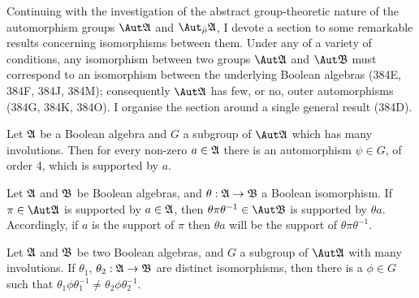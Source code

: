      
\def\chaptername{Automorphisms}
\def\sectionname{Outer automorphisms}
\def\cycleii#1#2#3{\cycle{#1\,_{#2}\,#3}}
     
     
Continuing with the investigation of the abstract group-theoretic nature
of the automorphism groups $\Aut\frak A$ and $\Aut_{\bar\mu}\frak A$, I
devote a section to some remarkable results concerning isomorphisms
between them.   Under any of a variety of conditions, any isomorphism between two groups $\Aut\frak A$ and $\Aut\frak B$ must correspond to an
isomorphism between the underlying Boolean algebras (384E, 384F, 384J,
384M);  consequently $\Aut\frak A$ has few, or no, outer automorphisms
(384G, 384K, 384O).   I organise the section around a single general
result (384D).
     
Let $\frak A$ be a Boolean algebra and $G$ a
subgroup of $\Aut\frak A$ which has many
involutions.   Then for every non-zero
$a\in\frak A$ there is an automorphism $\psi\in G$, of order 4, which
is supported by $a$.
     
     
Let $\frak A$ and $\frak B$ be Boolean algebras, and
$\theta:\frak A\to\frak B$ a Boolean isomorphism.   If
$\pi\in\Aut\frak A$ is
supported by $a\in\frak A$, then $\theta\pi\theta^{-1}\in\Aut\frak B$ is
supported by $\theta a$.      Accordingly, if $a$ is the support of $\pi$ then $\theta a$
will be the support of $\theta\pi\theta^{-1}$.
     
Let $\frak A$ and $\frak B$ be two Boolean
algebras, and $G$ a subgroup of $\Aut\frak A$ with many involutions.
If $\theta_1$, $\theta_2:\frak A\to\frak B$ are distinct isomorphisms,
then there is a $\phi\in G$ such that
$\theta_1\phi\theta_1^{-1}\ne\theta_2\phi\theta_2^{-1}$.
     
